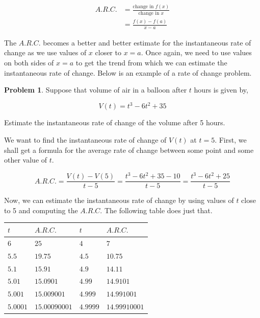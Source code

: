 \documentclass[12pt]{article}
\theoremstyle{definition}
\newtheorem{problem}{Problem}
\begin{document}
\begin{align}
    A.R.C. & = \frac{\text{change in } f(x)}{\text{change in } x} \\
           & = \frac{f(x)-f(a)}{x-a}
\end{align}

The $A.R.C.$ becomes a better and better estimate for the instantaneous rate of change as we use values of $x$ closer to $x=a$.
Once again, we need to use values on both sides of $x=a$ to get the trend from which we can estimate the instantaneous rate of change.
Below is an example of a rate of change problem.

\begin{problem}
Suppose that volume of air in a balloon after $t$ hours is given by,

\begin{equation}
    V(t) = t^3 - 6t^2 + 35 \label{eq:3}
\end{equation}

Estimate the instantaneous rate of change of the volume after 5 hours.
\end{problem}

We want to find the instantaneous rate of change of $V(t)$ at $t=5$.
First, we shall get a formula for the average rate of change between some point and some other value of $t$.

\begin{equation}
    A.R.C. = \frac{V(t)-V(5)}{t-5} = \frac{t^3-6t^2+35-10}{t-5} = \frac{t^3-6t^2+25}{t-5}
\end{equation}

Now, we can estimate the instantaneous rate of change by using values of $t$ close to 5 and computing the $A.R.C.$
The following table does just that.

\begin{table}[h]
    \renewcommand{\arraystretch}{1.5}
    \centering
    \begin{tabular}{>{\centering\arraybackslash}m{1.5cm}|>{\centering\arraybackslash}m{2.5cm}|>{\centering\arraybackslash}m{1.5cm}|>{\centering\arraybackslash}m{2.5cm}}
        $t$      & $A.R.C.$      & $t$      & $A.R.C.$      \\ \hline
        $6$      & $25$          & $4$      & $7$           \\
        $5.5$    & $19.75$       & $4.5$    & $10.75$       \\
        $5.1$    & $15.91$       & $4.9$    & $14.11$       \\
        $5.01$   & $15.0901$     & $4.99$   & $14.9101$     \\
        $5.001$  & $15.009001$   & $4.999$  & $14.991001$   \\
        $5.0001$ & $15.00090001$ & $4.9999$ & $14.99910001$
    \end{tabular}
\end{table}
\end{document}
